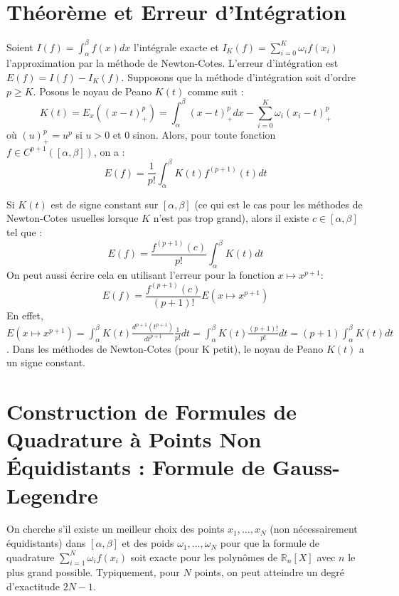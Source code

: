 \section{Théorème et Erreur d'Intégration}
\begin{theorem}
Soient $I(f) = \int_{\alpha}^{\beta} f(x) dx$ l'intégrale exacte et $I_K(f) = \sum_{i=0}^{K} \omega_i f(x_i)$ l'approximation par la méthode de Newton-Cotes. L'erreur d'intégration est $E(f) = I(f) - I_K(f)$.
Supposons que la méthode d'intégration soit d'ordre $p \ge K$. Posons le noyau de Peano $K(t)$ comme suit :
\[ K(t) = E_x((x-t)_+^p) = \int_{\alpha}^{\beta} (x-t)_+^p dx - \sum_{i=0}^{K} \omega_i (x_i-t)_+^p \]
où $(u)_+^p = u^p$ si $u>0$ et $0$ sinon.
Alors, pour toute fonction $f \in C^{p+1}([\alpha, \beta])$, on a :
\[ E(f) = \frac{1}{p!} \int_{\alpha}^{\beta} K(t) f^{(p+1)}(t) dt \]
\end{theorem}

Si $K(t)$ est de signe constant sur $[\alpha, \beta]$ (ce qui est le cas pour les méthodes de Newton-Cotes usuelles lorsque $K$ n'est pas trop grand), alors il existe $c \in [\alpha, \beta]$ tel que :
\[ E(f) = \frac{f^{(p+1)}(c)}{p!} \int_{\alpha}^{\beta} K(t) dt \]
On peut aussi écrire cela en utilisant l'erreur pour la fonction $x \mapsto x^{p+1}$:
\[ E(f) = \frac{f^{(p+1)}(c)}{(p+1)!} E(x \mapsto x^{p+1}) \]
En effet, $E(x \mapsto x^{p+1}) = \int_{\alpha}^{\beta} K(t) \frac{d^{p+1}(t^{p+1})}{dt^{p+1}} \frac{1}{p!} dt = \int_{\alpha}^{\beta} K(t) \frac{(p+1)!}{p!} dt = (p+1) \int_{\alpha}^{\beta} K(t) dt$.
Dans les méthodes de Newton-Cotes (pour K petit), le noyau de Peano $K(t)$ a un signe constant.

\section{Construction de Formules de Quadrature à Points Non Équidistants : Formule de Gauss-Legendre}
On cherche s'il existe un meilleur choix des points $x_1, \dots, x_N$ (non nécessairement équidistants) dans $[\alpha, \beta]$ et des poids $\omega_1, \dots, \omega_N$ pour que la formule de quadrature $\sum_{i=1}^N \omega_i f(x_i)$ soit exacte pour les polynômes de $\mathbb{R}_n[X]$ avec $n$ le plus grand possible. Typiquement, pour $N$ points, on peut atteindre un degré d'exactitude $2N-1$.


